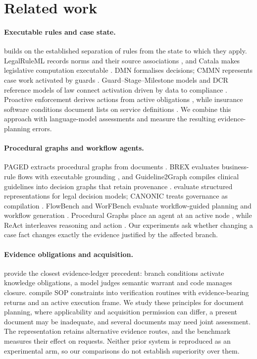 \section{Related work}
\label{sec:related}

\paragraph{Executable rules and case state.}
\casepath builds on the established separation of rules from the state to
which they apply. LegalRuleML records norms and their source associations
\citep{oasis2021legalruleml}, and Catala makes legislative computation
executable \citep{merigoux2021catala}. DMN formalises decisions; CMMN
represents case work activated by guards \citep{omg2024dmn,omg2016cmmn}.
Guard--Stage--Milestone models and DCR reference models of law connect
activation driven by data to compliance
\citep{vaculin2011gsm,lopez2020dcrlaw}. Proactive enforcement derives actions
from active obligations \citep{basin2024proactive}, while insurance software
conditions document lists on service definitions
\citep{servicenow2026documentlists}. We combine this approach with
language-model assessments and measure the resulting evidence-planning
errors.

\paragraph{Procedural graphs and workflow agents.}
PAGED extracts procedural graphs from documents \citep{du2024paged}.
BREX evaluates business-rule flows with executable grounding
\citep{yang2026brex}, and Guideline2Graph compiles clinical guidelines into
decision graphs that retain provenance \citep{kilic2026guideline2graph}.
\citet{graus2026decisionmodels} evaluate structured representations for
legal decision models; CANONIC treats governance as compilation
\citep{hadley2026canonic}. FlowBench and WorFBench evaluate workflow-guided
planning and workflow generation \citep{xiao2024flowbench,qiao2024worfbench}.
Procedural Graphs place an agent at an active node
\citep{lu2026proceduralgraphs}, while ReAct interleaves reasoning and action
\citep{yao2022react}. Our experiments ask whether changing a case fact changes
exactly the evidence justified by the affected branch.

\paragraph{Evidence obligations and acquisition.}
\citet{kim2026evidenceobligation} provide the closest evidence-ledger
precedent: branch conditions activate knowledge obligations, a model judges
semantic warrant and code manages closure. \citet{yu2026compile} compile
SOP constraints into verification routines with evidence-bearing returns
and an active execution frame. We study these principles for document
planning, where applicability and acquisition permission can differ, a
present document may be inadequate, and several documents may need joint
assessment. The representation retains alternative evidence routes, and
the benchmark measures their effect on requests. Neither prior system is
reproduced as an experimental arm, so our comparisons do not establish
superiority over them.


